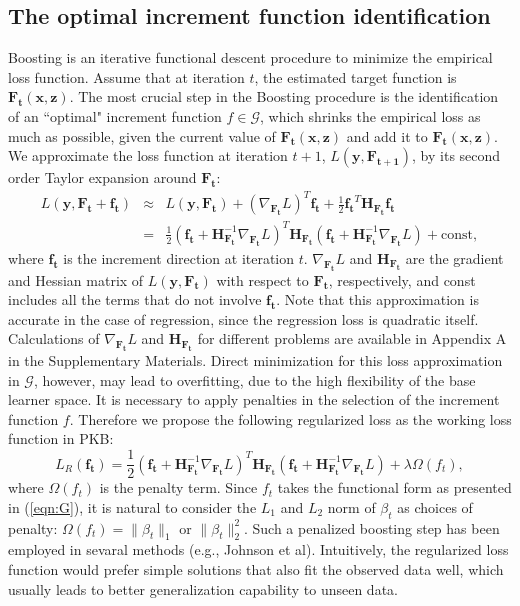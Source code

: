 \documentclass[a4paper,12pt]{article}
\newcommand{\bd}[1]{\mathbf{#1}}
\newcommand{\grad}[2]{\nabla_{\bd{#2}} #1}
\newcommand{\hess}[1]{\bd{H}_{\bd{#1}}}
\begin{document}
	\subsection{The optimal increment function identification} \label{sec:identify}
	Boosting is an iterative functional descent procedure to minimize the empirical loss function. Assume that at iteration $t$, the estimated target function is $\bd{F_t}(\bd{x}, \bd{z})$. The most crucial step in the Boosting procedure is the identification of an ``optimal" increment function $f \in \mathcal{G}$, which shrinks the empirical loss as much as possible, given the current value of $\bd{F_t}(\bd{x}, \bd{z})$ and add it to $\bd{F_t}(\bd{x}, \bd{z})$. We approximate the loss function at iteration $t+1$, $L(\bd{y},\bd{F_{t+1}})$, by its second order Taylor expansion around $\bd{F_t}$:
	\begin{eqnarray*}
		L(\bd{y}, \bd{F_t} + \bd{f_t}) &\approx& L(\bd{y}, \bd{F_t}) +  (\grad{L}{F_t})^T \bd{f_t} + \frac{1}{2}\bd{f_t}^T \hess{F_t} \bd{f_t} \\
		& = & \frac{1}{2} (\bd{f_t} + \hess{F_t}^{-1} \grad{L}{F_t})^T \hess{F_t} (\bd{f_t} + \hess{F_t}^{-1} \grad{L}{F_t}) + \mbox{const},
	\end{eqnarray*}
where $\bd{f_t}$ is the increment direction at iteration $t$. $\nabla_{\bd{F_t}} L$ and $\bd{H}_{\bd{F_t}}$ are the gradient and Hessian matrix of $L(\bd{y}, \bd{F_t})$ with respect to $\bd{F_t}$, respectively, and const includes all the terms that do not involve $\bd{f_t}$. Note that this approximation is accurate in the case of regression, since the regression loss is quadratic itself. Calculations of $\grad{L}{F_t}$ and $\hess{F_t}$ for different problems are available in Appendix A in the Supplementary Materials. Direct minimization for this loss approximation in $\mathcal{G}$, however, may lead to overfitting, due to the high flexibility of the base learner space. It is necessary to apply penalties in the selection of the increment function  $f$. Therefore we propose the following regularized loss as the working loss function in PKB:
$$L_{R}(\bd{f_t}) = \frac{1}{2} (\bd{f_t} + \hess{F_t}^{-1} \grad{L}{F_t})^T \hess{F_t} (\bd{f_t} + \hess{F_t}^{-1} \grad{L}{F_t}) + \lambda \Omega({f_t}),$$
where $\Omega({f_t})$ is the penalty term. Since ${f_t}$ takes the functional form as presented in (\ref{eqn:G}), it is natural to consider the  $L_1$ and $L_2$ norm of $\beta_t$ as choices of penalty: $\Omega({f_t}) = \| \beta_t \|_1$ or $\| \beta_t \|_2^2$. Such a penalized boosting step has been employed in sevaral methods (e.g., Johnson et al). \cite{johnson2014learning} Intuitively, the regularized loss function would prefer simple solutions that also fit the observed data well, which usually leads to better generalization capability to unseen data.
\end{document}

